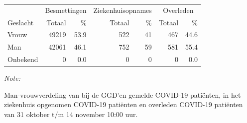 \documentclass[
  english,
  man,floatsintext]{apa6}
\begin{document}
\begin{table}[H]
\centering\begingroup\fontsize{11}{13}\selectfont

\begin{threeparttable}
\begin{tabular}{lrrrrrr}
\toprule
\multicolumn{1}{c}{ } & \multicolumn{2}{c}{Besmettingen} & \multicolumn{2}{c}{Ziekenhuisopnames} & \multicolumn{2}{c}{Overleden} \\
\cmidrule(l{3pt}r{3pt}){2-3} \cmidrule(l{3pt}r{3pt}){4-5} \cmidrule(l{3pt}r{3pt}){6-7}
Geslacht & Totaal & \% & Totaal & \% & Totaal & \%\\
\midrule
Vrouw & 49219 & 53.9 & 522 & 41 & 467 & 44.6\\
Man & 42061 & 46.1 & 752 & 59 & 581 & 55.4\\
Onbekend & 0 & 0.0 & 0 & 0 & 0 & 0.0\\
\bottomrule
\end{tabular}
\begin{tablenotes}
\item \textit{Note: } 
\item Man-vrouwverdeling van bij de GGD’en gemelde COVID-19 patiënten, in het ziekenhuis opgenomen COVID-19 patiënten en overleden COVID-19 patiënten van 31 oktober t/m 14 november 10:00 uur.
\end{tablenotes}
\end{threeparttable}
\endgroup{}
\end{table}
\newpage
\end{document}
